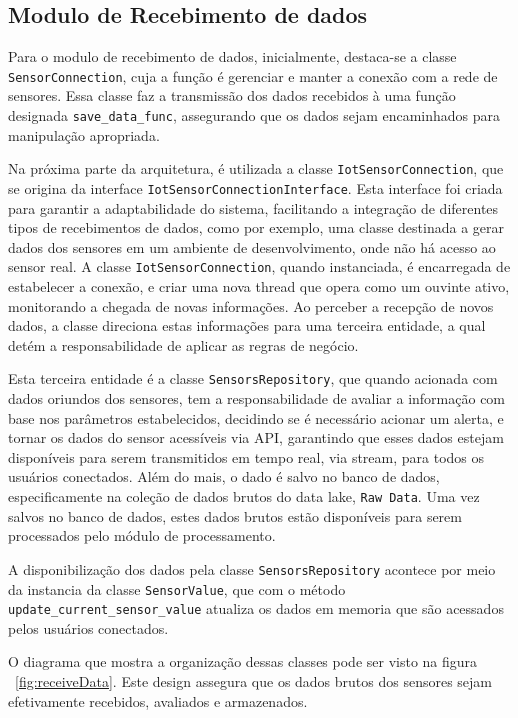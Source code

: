 \subsection{Modulo de Recebimento de dados}\label{subsec:receiveDataModuleArch}
Para o modulo de recebimento de dados, inicialmente, destaca-se a classe \texttt{SensorConnection}, cuja a função é gerenciar e manter a conexão com a rede de sensores. Essa classe faz a transmissão dos dados recebidos à uma função designada \texttt{save\_data\_func}, assegurando que os dados sejam encaminhados para manipulação apropriada.

Na próxima parte da arquitetura, é utilizada a classe \texttt{IotSensorConnection}, que se origina da interface \texttt{IotSensorConnectionInterface}. Esta interface foi criada para garantir a adaptabilidade do sistema, facilitando a integração de diferentes tipos de recebimentos de dados, como por exemplo, uma classe destinada a gerar dados dos sensores em um ambiente de desenvolvimento, onde não há acesso ao sensor real. A classe \texttt{IotSensorConnection}, quando instanciada, é encarregada de estabelecer a conexão, e criar uma nova thread que opera como um ouvinte ativo, monitorando a chegada de novas informações. Ao perceber a recepção de novos dados, a classe direciona estas informações para uma terceira entidade, a qual detém a responsabilidade de aplicar as regras de negócio.

Esta terceira entidade é a classe \texttt{SensorsRepository}, que quando acionada com dados oriundos dos sensores, tem a responsabilidade de avaliar a informação com base nos parâmetros estabelecidos, decidindo se é necessário acionar um alerta, e tornar os dados do sensor acessíveis via \gls{API}, garantindo que esses dados estejam disponíveis para serem transmitidos em tempo real, via stream, para todos os usuários conectados. Além do mais, o dado é salvo no banco de dados, especificamente na coleção de dados brutos do data lake, \texttt{Raw Data}. Uma vez salvos no banco de dados, estes dados brutos estão disponíveis para serem processados pelo módulo de processamento.

A disponibilização dos dados pela classe \texttt{SensorsRepository} acontece por meio da instancia da classe \texttt{SensorValue}, que com o método \texttt{update\_current\_sensor\_value} atualiza os dados em memoria que são acessados pelos usuários conectados.

O diagrama que mostra a organização dessas classes pode ser visto na figura ~\ref{fig:receiveData}. Este design assegura que os dados brutos dos sensores sejam efetivamente recebidos, avaliados e armazenados.

